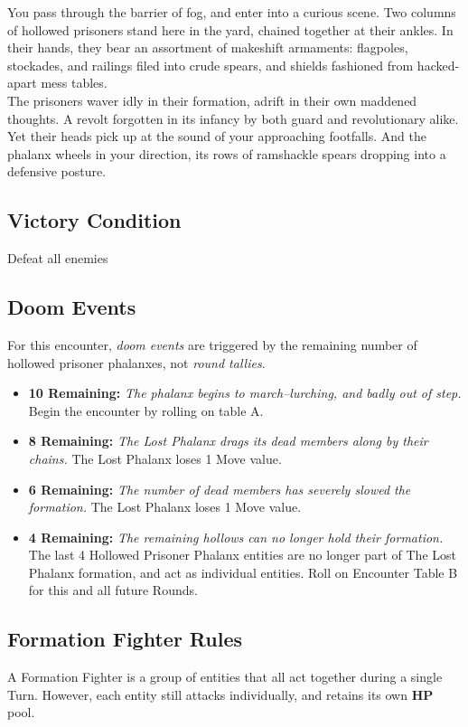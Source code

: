 You pass through the barrier of fog, and enter into a curious scene. Two columns of hollowed prisoners stand here in the yard, chained together at their ankles. In their hands, they bear an assortment of makeshift armaments: flagpoles, stockades, and railings filed into crude spears, and shields fashioned from hacked-apart mess tables.\\

The prisoners waver idly in their formation, adrift in their own maddened thoughts. A revolt forgotten in its infancy by both guard and revolutionary alike. Yet their heads pick up at the sound of your approaching footfalls. And the phalanx wheels in your direction, its rows of ramshackle spears dropping into a defensive posture.

\subsection*{Victory Condition}
Defeat all enemies

\subsection*{Doom Events}
For this encounter, \emph{doom events} are triggered by the remaining number of hollowed prisoner phalanxes, not \emph{round tallies}.

\begin{itemize}
\item \textbf{10 Remaining:} \emph{The phalanx begins to march--lurching, and badly out of step.} Begin the encounter by rolling on table A.
\item \textbf{8 Remaining:} \emph{The Lost Phalanx drags its dead members along by their chains.} The Lost Phalanx loses 1 Move value.
\item \textbf{6 Remaining:} \emph{The number of dead members has severely slowed the formation.} The Lost Phalanx loses 1 Move value.
\item \textbf{4 Remaining:} \emph{The remaining hollows can no longer hold their formation.} The last 4 Hollowed Prisoner Phalanx entities are no longer part of The Lost Phalanx formation, and act as individual entities. Roll on Encounter Table B for this and all future Rounds.
\end{itemize}

\pagebreak

\subsection*{Formation Fighter Rules}
A Formation Fighter is a group of entities that all act together during a single Turn. However, each entity still attacks individually, and retains its own \textbf{HP} pool.\\

